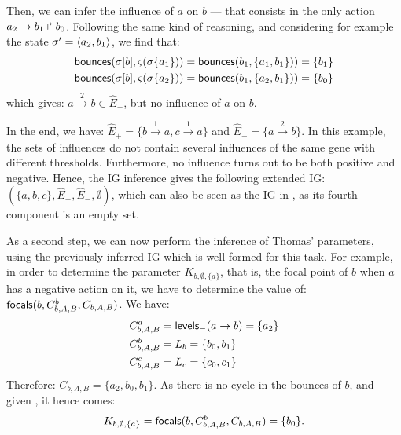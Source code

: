 Then, we can infer the influence of $a$ on $b$ --- that consists in the only action $a_2\rightarrow b_1\Rsh b_0$.
Following the same kind of reasoning, and considering for example the state $\sigma' = \mbox{$\langle a_2, b_1 \rangle$}$, we find that:
\begin{align*}
\mathsf{bounces}({\sigma[b]},\varsigma(\sigma\{a_1\})) &= \mathsf{bounces}(b_1,\{a_1, b_1\})) = \{b_1\} \\
\mathsf{bounces}({\sigma[b]},\varsigma(\sigma\{a_2\})) &= \mathsf{bounces}(b_1,\{a_2, b_1\})) = \{b_0\}
\end{align*}
which gives: $a \xrightarrow{2} b \in \hat{E}_-$, but no influence of $a$ on $b$.

In the end, we have: $\hat{E}_+ = \{b \xrightarrow{1} a, c \xrightarrow{1} a\}$ and $\hat{E}_- = \{a \xrightarrow{2} b\}$.
In this example, the sets of influences do not contain several influences of the same gene with different thresholds. Furthermore, no influence turns out to be both positive and negative. Hence, the IG inference gives the following extended IG:
$(\{a, b, c\}, \hat{E}_+, \hat{E}_-, \emptyset)$,
which can also be seen as the IG in , as its fourth component is an empty set.

As a second step, we can now perform the inference of Thomas' parameters, using the previously inferred IG which is well-formed for this task.
For example, in order to determine the parameter $K_{b,\emptyset,\{a\}}$, that is, the focal point of $b$ when $a$ has a negative action on it, we have to determine the value of: $\mathsf{focals}(b,C^b_{b,A,B},C_{b,A,B})$. We have:
\begin{align*}
C^a_{b,A,B} &= \mathsf{levels}_-(a\rightarrow b) = \{a_2\} \\
C^b_{b,A,B} &= L_b = \{b_0, b_1\} \\
C^c_{b,A,B} &= L_c = \{c_0, c_1\}
\end{align*}
Therefore: $C_{b,A,B} = \{a_2, b_0, b_1\}$.
As there is no cycle in the bounces of $b$, and given , it hence comes:
$$K_{b,\emptyset,\{a\}} = \mathsf{focals}(b,C^b_{b,A,B},C_{b,A,B}) = \{b_0\}.$$

